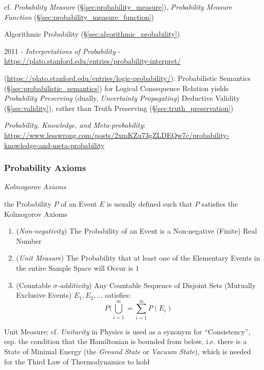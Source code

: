 cf. \emph{Probability Measure} (\S\ref{sec:probability_measure}),
\emph{Probability Measure Function} (\S\ref{sec:probability_measure_function})

\fist Algorithmic Probability (\S\ref{sec:algorithmic_probability})

2011 - \emph{Interpretations of Probability} -
\url{https://plato.stanford.edu/entries/probability-interpret/}

(\url{https://plato.stanford.edu/entries/logic-probability/}): Probabilistic
Semantics (\S\ref{sec:probabilistic_semantics}) for Logical Consequence Relation
yields \emph{Probability Preserving} (dually, \emph{Uncertainty Propagating})
Deductive Validity (\S\ref{sec:validity}), rather than Truth Preserving
(\S\ref{sec:truth_preservation})

\emph{Probability, Knowledge, and Meta-probability}:
\url{https://www.lesswrong.com/posts/2xmKZu73gZLDEQw7c/probability-knowledge-and-meta-probability}



\subsubsection{Probability Axioms}\label{sec:probability_axioms}

\emph{Kolmogorov Axioms}

the Probability $P$ of an Event $E$ is usually defined such that $P$ satisfies
the Kolmogorov Axioms

\begin{enumerate}
  \item (\emph{Non-negativity}) The Probability of an Event is a Non-negative
    (Finite) Real Number
  \item (\emph{Unit Measure}) The Probability that at least one of the
    Elementary Events in the entire Sample Space will Occur is $1$
  \item (Countable \emph{$\sigma$-additivity}) Any Countable Sequence of
    Disjoint Sets (Mutually Exclusive Events) $E_1, E_2, \ldots$ satisfies:
    \[
      P (\bigcup_{i=1}^\infty = \sum_{i=1}^\infty P(E_i)
    \]
\end{enumerate}

\fist Unit Measure: cf. \emph{Unitarity} in Physics is used as a synonym for
``Consistency'', esp. the condition that the Hamiltonian is bounded from below,
i.e. there is a State of Minimal Energy (the \emph{Ground State} or
\emph{Vacuum State}), which is needed for the Third Law of Thermodynamics to
hold

